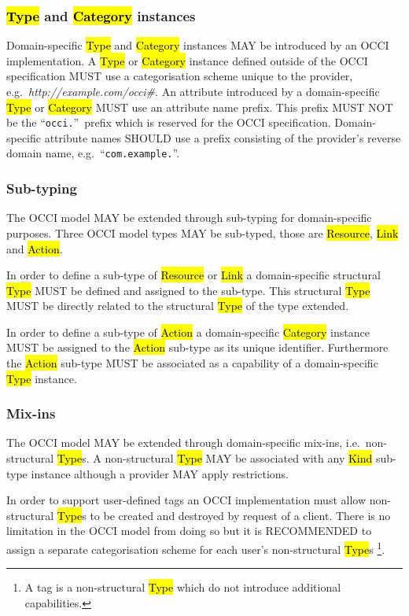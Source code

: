 \documentclass[10pt,a4paper,british]{article}
\begin{document}
\subsubsection{\hl{Type} and \hl{Category} instances}
\label{sec:ext:category}
Domain-specific \hl{Type} and \hl{Category} instances MAY be introduced by an
OCCI implementation.
%
A \hl{Type} or \hl{Category} instance defined outside of the OCCI
specification MUST use a categorisation scheme unique to the provider,
e.g.~\textit{http://example.com/occi\#}.
%
An attribute introduced by a domain-specific \hl{Type} or \hl{Category} MUST
use an attribute name prefix. This prefix MUST NOT be the ``\texttt{occi.}''~prefix
which is reserved for the OCCI specification. Domain-specific attribute names
SHOULD use a prefix consisting of the provider's reverse domain name,
e.g.~``\texttt{com.example.}''.

\subsubsection{Sub-typing}
The OCCI model MAY be extended through sub-typing for domain-specific purposes.
Three OCCI model types MAY be sub-typed, those are \hl{Resource}, \hl{Link} and
\hl{Action}.

In order to define a sub-type of \hl{Resource} or \hl{Link} a domain-specific
structural \hl{Type} MUST be defined and assigned to the sub-type. This
structural \hl{Type} MUST be directly related to the structural \hl{Type} of
the type extended.

In order to define a sub-type of \hl{Action} a domain-specific \hl{Category}
instance MUST be assigned to the \hl{Action} sub-type as its unique identifier.
Furthermore the \hl{Action} sub-type MUST be associated as a capability of a
domain-specific \hl{Type} instance.

\subsubsection{Mix-ins}
The OCCI model MAY be extended through domain-specific mix-ins,
i.e.~non-structural \hl{Type}s.  A non-structural \hl{Type} MAY be associated
with any \hl{Kind} sub-type instance although a provider MAY apply
restrictions.

In order to support user-defined tags an OCCI implementation must allow
non-structural \hl{Type}s to be created and destroyed by request of a client.
There is no limitation in the OCCI model from doing so but it is RECOMMENDED to
assign a separate categorisation scheme for each user's non-structural
\hl{Type}s%
\footnote{A tag is a non-structural \hl{Type} which do not introduce additional
capabilities.}.
\end{document}
